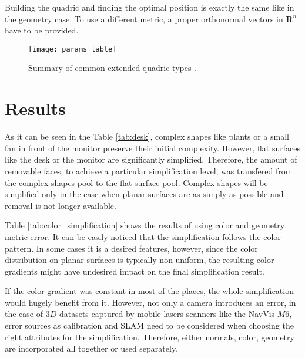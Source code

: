 Building the quadric and finding the optimal position is exactly the same like in the geometry case. To use a different metric, a proper orthonormal vectors in $\mathbf{R}^n$ have to be provided.

\begin{figure}[H]
  \begin{center}
    \texttt{[image: params\_table]}
    \caption{Summary of common extended quadric types \cite{garland99}.}
    \label{fig:params_table}
  \end{center}
\end{figure}

\section{Results}

As it can be seen in the Table \ref{tab:desk}, complex shapes like plants or a small fan in front of the monitor preserve their initial complexity. However, flat surfaces like the desk or the monitor are significantly simplified. Therefore, the amount of removable faces, to achieve a particular simplification level, was transfered from the complex shapes pool to the flat surface pool. Complex shapes will be simplified only in the case when planar surfaces are as simply as possible and removal is not longer available.

Table \ref{tab:color_simplification} shows the results of using color and geometry metric error. It can be easily noticed that the simplification follows the color pattern. In some cases it is a desired features, however, since the color distribution on planar surfaces is typically non-uniform, the resulting color gradients might have undesired impact on the final simplification result.

If the color gradient was constant in most of the places, the whole simplification would hugely benefit from it. However, not only a camera introduces an error, in the case of $3D$ datasets captured by mobile lasers scanners like the NavVis $M6$, error sources as calibration and SLAM need to be considered when choosing the right attributes for the simplification. Therefore, either normals, color, geometry are incorporated all together or used separately.

